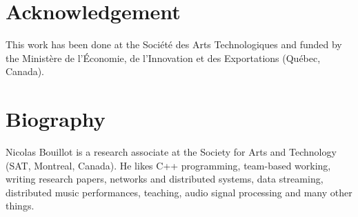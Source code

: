 \documentclass{article}
\begin{document}
\section{Acknowledgement}
This work has been done at the Société des Arts Technologiques and funded by the Ministère de l'Économie, de l'Innovation et des Exportations (Québec, Canada).



\section{Biography}
 Nicolas Bouillot is a research associate at the Society for Arts and Technology (SAT, Montreal, Canada). He likes C++ programming, team-based working, writing research papers, networks and distributed systems, data streaming, distributed music performances, teaching, audio signal processing and many other things. 
\end{document}
